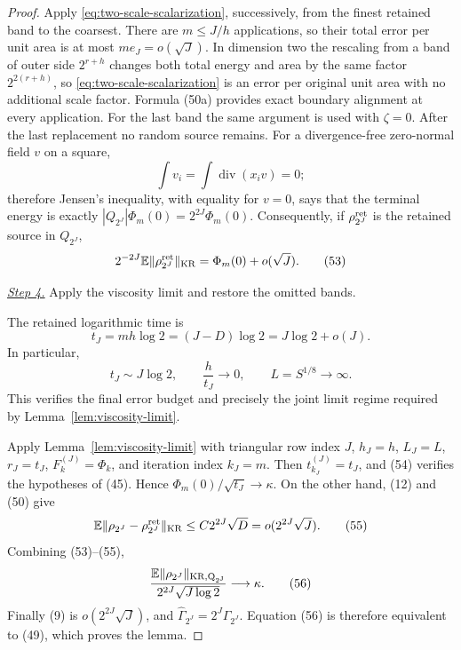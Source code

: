 \documentclass{smfart}
\theoremstyle{definition}
\newcommand{\1}{\mathbf 1}
\begin{document}
\begin{proof}
Apply \eqref{eq:two-scale-scalarization}, successively, from the finest retained band to the coarsest.
There are $m\leq J/h$ applications, so their total error per unit
area is at most $me_ J=o(\sqrt J)$.  In dimension two the rescaling
from a band of outer side $2^{r+h}$ changes both total energy and area
by the same factor $2^{2(r+h)}$, so \eqref{eq:two-scale-scalarization} is an error per original unit
area with no additional scale factor.  Formula (50a) provides exact
boundary alignment at every application.  For the last band the same argument is used
with $\zeta=0$.  After the last replacement no random source remains.
For a divergence-free zero-normal field $v$ on a square,
\begin{equation*}
\int v_ i=\int\operatorname {div}(x_ i v)=0;
\end{equation*}
therefore Jensen's inequality, with equality for $v=0$, says that the
terminal energy is exactly
$|Q_{2^J}|\Phi_m(0)=2^{2J}\Phi_m(0)$.  Consequently, if
$\rho_{2^J}^{\rm ret}$ is the retained source in $Q_ {2^J}$,
\begin{equation}
2^{-2J}\mathbb E\|\rho_{2^J}^{\rm ret}\|_ {\rm KR}
=\Phi_ m(0)+o(\sqrt J).
\tag{53}
\end{equation}

\smallskip\noindent
\underline{\textit{Step 4.}} Apply the viscosity limit and restore the omitted bands.

The retained logarithmic time is
\begin{equation}
t_ J=mh\log2=(J-D)\log2=J\log2+o(J).
\tag{54}
\end{equation}
In particular,
\begin{equation*}
t_J\sim J\log2,\qquad
\frac{h}{t_J}\longrightarrow0,\qquad L=S^{1/8}\longrightarrow\infty.
\end{equation*}
This verifies the final error budget and precisely the joint limit regime
required by Lemma~\ref{lem:viscosity-limit}.

Apply Lemma~\ref{lem:viscosity-limit} with triangular row index $J$,
$h_J=h$, $L_J=L$, $r_J=t_J$, $F_k^{(J)}=\Phi_k$, and iteration index
$k_J=m$.  Then $t_{k_J}^{(J)}=t_J$, and (54) verifies the hypotheses
of (45).  Hence $\Phi_m(0)/\sqrt{t_J}\to\kappa$.  On the other hand,
(12) and (50) give
\begin{equation}
\mathbb E\|\rho_{2^J}-\rho_{2^J}^{\rm ret}\|_ {\rm KR}
\leq C2^{2J}\sqrt D=o(2^{2J}\sqrt J).
\tag{55}
\end{equation}
Combining (53)--(55),
\begin{equation}
\frac{\mathbb E\|\rho_{2^J}\|_ {\rm KR,Q_ {2^J}}}
{2^{2J}\sqrt{J\log2}}\longrightarrow\kappa.
\tag{56}
\end{equation}
Finally (9) is $o(2^{2J}\sqrt J)$, and
$\widehat\Gamma_ {2^J}=2^J\Gamma_ {2^J}$.  Equation (56) is therefore
equivalent to (49), which proves the lemma.

\end{proof}
\end{document}
